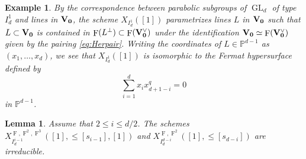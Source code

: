 \documentclass[12pt,a4paper]{article}
\newtheorem{lem}[thm]{Lemma}
\newtheorem{eg}[thm]{Example}
\DeclareMathOperator{\GL}{GL}
\DeclareMathOperator{\oF}{F}
\newcommand{\bP}{\mathbb{P}}
\begin{document}
\begin{eg}\label{eq:Fermat}
By the correspondence between parabolic subgroups of $\GL_d$ of type $I_{d}^{1}$ and lines in $\bf{V}_0$, the scheme $X_{I_{d}^{1}}([1])$ parametrizes lines $L$ in $\bf{V}_0$ such that $L \subset \bf{V}_0$ is contained in $\oF (L^{\perp}) \subset \oF (\bf{V}_0^{\vee})$ under the identification $\bf{V}_0 \simeq \oF (\bf{V}_0^{\vee})$ given by the pairing \eqref{eq:Herpair}. 
Writing the coordinates of $L \in \bP^{d-1}$ as $(x_1,\ldots , x_d)$, we see that $X_{I_{d}^{1}}([1])$ is isomorphic to the Fermat hypersurface defined by 
\[
\sum_{i=1}^d x_i x_{d+1-i}^q=0 
\]
in $\bP^{d-1}$. 
\end{eg}

\begin{lem}\label{lem:irred}
Assume that $2 \leq i \leq d/2$. The schemes 
$X_{I_{d}^{i-1}}^{\oF,\oF^2,\oF^3}([1],{\leq}[s_{i-1}],[1])$ and 
$X_{I_{d}^{d-i}}^{\oF,\oF^2}([1],{\leq}[s_{d-i}])$ are irreducible. 
\end{lem}
\end{document}
